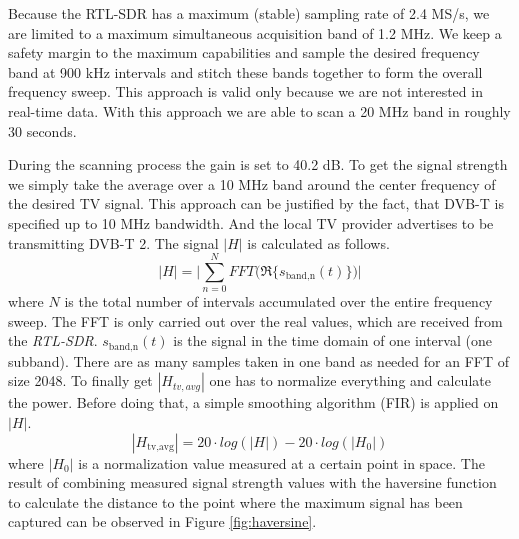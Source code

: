 Because the RTL-SDR has a maximum (stable) sampling rate of 2.4 MS/s, we are
limited to a maximum simultaneous acquisition band of 1.2 MHz. We keep a safety
margin to the maximum capabilities and sample the desired frequency band at 900
kHz intervals and stitch these bands together to form the overall frequency
sweep. This approach is valid only because we are not interested in real-time
data.  With this approach we are able to scan a 20 MHz band in roughly 30
seconds.

During the scanning process the gain is set to 40.2 dB. To get the
signal strength we simply take the average over a 10 MHz band around the
center frequency of the desired TV signal. This approach can be
justified by the fact, that DVB-T is specified up to 10 MHz bandwidth.
And the local TV provider advertises to be transmitting DVB-T 2.
The signal \ensuremath{|H|} is calculated as follows.  
\begin{equation}
	|H| = \Biggl| \sum_{n=0}^N FFT\biggl( \Re\{ s_{\text{band,n}}(t) \} \biggr) \Biggr|
\end{equation}     where \ensuremath{N} is the total number of intervals
accumulated over the entire frequency sweep. The FFT is only carried out over
the real values, which are received from the \textit{RTL-SDR}.
\ensuremath{s_{\text{band,n}}(t)} is the signal in the time domain of one
interval (one subband). There are as many samples taken in one band as needed
for an FFT of size 2048. To finally get \ensuremath{|H_{tv,avg}|} one has to
normalize everything and calculate the power. Before doing that, a simple
smoothing algorithm (FIR) is applied on \ensuremath{|H|}.  
\begin{equation}
	|H_{\text{tv,avg}}| = 20 \cdot log (|H|) - 20 \cdot log(|H_0|)
\end{equation}   
where \ensuremath{|H_0|} is a normalization value measured at a certain point
in space. The result of combining measured signal strength values with the
haversine function to calculate the distance to the point where the maximum
signal has been captured can be observed in Figure \ref{fig:haversine}.
